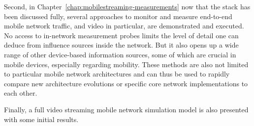 Second, in Chapter~\ref{chap:mobilestreaming-measurements} now that the stack has been discussed fully, several approaches to monitor and measure end-to-end mobile network traffic, and video in particular, are demonstrated and executed. No access to in-network measurement probes limits the level of detail one can deduce from influence sources inside the network. But it also opens up a wide range of other device-based information sources, some of which are crucial in mobile devices, especially regarding mobility. These methods are also not limited to particular mobile network architectures and can thus be used to rapidly compare new architecture evolutions or specific core network implementations to each other. 

Finally, a full video streaming mobile network simulation model is also presented with some initial results.










